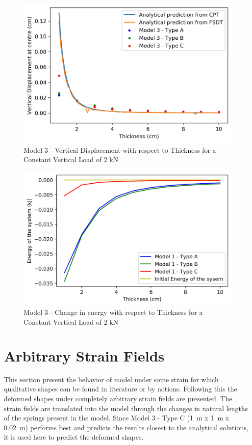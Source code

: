  \begin{figure}[!htbp]
     \centering
     \includegraphics{Figures/M3_t_plt.png}
     \caption{Model 3 - Vertical Displacement with respect to Thickness for a Constant Vertical Load of 2 kN}
     \label{fig:M3_t_plt}
 \end{figure}
 
 \begin{figure}[!htbp]
     \centering
     \includegraphics{Figures/M3_t_energy.png}
     \caption{Model 3 - Change in energy with respect to Thickness for a Constant Vertical Load of 2 kN}
     \label{fig:M3_t_energy}
 \end{figure}
 
 \section{Arbitrary Strain Fields}
 This section present the behavior of model under some strain for which qualitative shapes can be found in literature or by notions. Following this the deformed shapes under completely arbitrary strain fields are presented. The strain fields are translated into the model through the changes in natural lengths of the springs present in the model. Since Model 3 - Type C (1~m x 1~m x 0.02~m) performs best and predicts the results closest to the analytical solutions, it is used here to predict the deformed shapes.
 
 